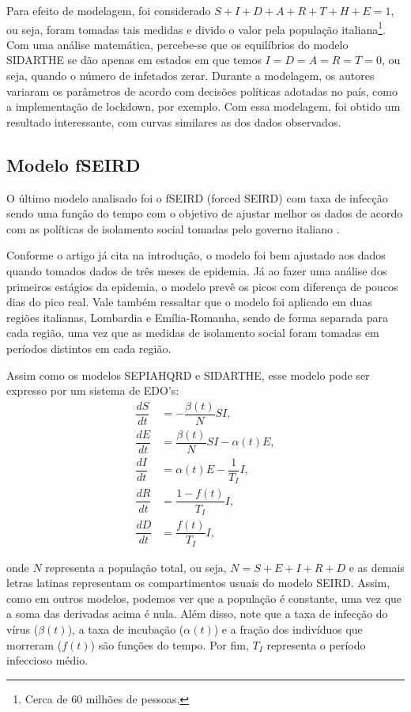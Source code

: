 \documentclass{article}
\begin{document}
Para efeito de modelagem, foi considerado $S + I + D + A + R + T + H + E = 1$, ou seja, foram tomadas tais medidas e divido o valor pela população italiana\footnote{Cerca de 60 milhões de pessoas.}. Com uma análise matemática, percebe-se que os equilíbrios do modelo SIDARTHE se dão apenas em estados em que temos $I = D = A = R = T = 0$, ou seja, quando o número de infetados zerar. Durante a modelagem, os autores variaram os parâmetros de acordo com decisões políticas adotadas no país, como a implementação de lockdown, por exemplo. Com essa modelagem, foi obtido um resultado interessante, com curvas similares as dos dados observados.

\subsection{Modelo fSEIRD}

O último modelo analisado foi o fSEIRD (forced SEIRD) com taxa de infecção sendo uma função do tempo com o objetivo de ajustar melhor os dados de acordo com as políticas de isolamento social tomadas pelo governo italiano \cite{piccolomini}.

Conforme o artigo já cita na introdução, o modelo foi bem ajustado aos dados quando tomados dados de três meses de epidemia. Já ao fazer uma análise dos primeiros estágios da epidemia, o modelo prevê os picos com diferença de poucos dias do pico real. Vale também ressaltar que o modelo foi aplicado em duas regiões italianas, Lombardia e Emília-Romanha, sendo de forma separada para cada região, uma vez que as medidas de isolamento social foram tomadas em períodos distintos em cada região.

Assim como os modelos SEPIAHQRD e SIDARTHE, esse modelo pode ser expresso por um sistema de EDO's:
\begin{equation}
    \label{piccolomini_model}
    \begin{split}
        \dfrac{dS}{dt} & = -\dfrac{\beta(t)}{N}SI, \\
        \dfrac{dE}{dt} & = \dfrac{\beta(t)}{N}SI - \alpha(t) E, \\
        \dfrac{dI}{dt} & = \alpha(t) E - \dfrac{1}{T_I}I, \\
        \dfrac{dR}{dt} & = \dfrac{1 - f(t)}{T_I}I, \\
        \dfrac{dD}{dt} & = \dfrac{f(t)}{T_I}I,
    \end{split}
\end{equation}

\noindent onde $N$ representa a população total, ou seja, $N = S + E + I + R + D$ e as demais letras latinas representam os compartimentos usuais do modelo SEIRD. Assim, como em outros modelos, podemos ver que a população é constante, uma vez que a soma das derivadas acima é nula. Além disso, note que a taxa de infecção do vírus ($\beta(t)$), a taxa de incubação ($\alpha(t)$) e a fração dos indivíduos que morreram ($f(t)$) são funções do tempo. Por fim, $T_I$ representa o período infeccioso médio.
\end{document}
